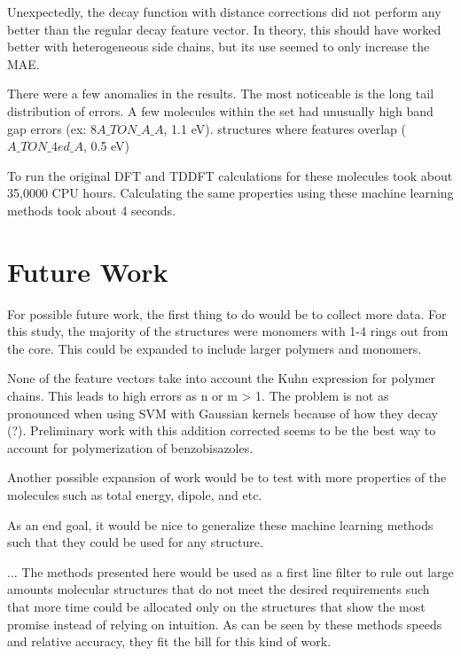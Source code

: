 \documentclass[10pt]{article}
\begin{document}
Unexpectedly, the decay function with distance corrections did not perform any better than the regular decay feature vector. In theory, this should have worked better with heterogeneous side chains, but its use seemed to only increase the MAE.

There were a few anomalies in the results. The most noticeable is the long tail distribution of errors. A few molecules within the set had unusually high band gap errors (ex: $8A\_TON\_A\_A$, 1.1 eV). structures where features overlap ($A\_TON\_4ed\_A$, 0.5 eV)

To run the original DFT and TDDFT calculations for these molecules took about 35,0000 CPU hours. Calculating the same properties using these machine learning methods took about 4 seconds.


\section{Future Work}

For possible future work, the first thing to do would be to collect more data. For this study, the majority of the structures were monomers with 1-4 rings out from the core. This could be expanded to include larger polymers and monomers.

None of the feature vectors take into account the Kuhn expression for polymer chains. This leads to high errors as n or m > 1. The problem is not as pronounced when using SVM with Gaussian kernels because of how they decay (?). Preliminary work with this addition corrected seems to be the best way to account for polymerization of benzobisazoles.

Another possible expansion of work would be to test with more properties of the molecules such as total energy, dipole, and etc.

As an end goal, it would be nice to generalize these machine learning methods such that they could be used for any structure.

... The methods presented here would be used as a first line filter to rule out large amounts molecular structures that do not meet the desired requirements such that more time could be allocated only on the structures that show the most promise instead of relying on intuition. As can be seen by these methods speeds and relative accuracy, they fit the bill for this kind of work.

\end{document}
